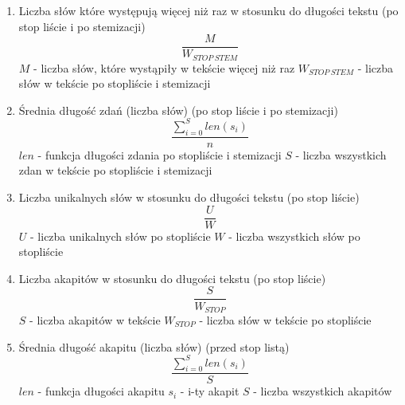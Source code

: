 \documentclass{classrep}
\begin{document}
\begin{enumerate}
  \item Liczba słów które występują więcej niż raz w stosunku do długości tekstu (po stop liście i po stemizacji)
  \newline 
  \begin{equation}
  	\frac{M}{W_{STOP\ STEM}}
  \end{equation}
  \newline \quad $M$ - liczba słów, które wystąpiły w tekście więcej niż raz
  \newline \quad $W_{STOP\ STEM}$ - liczba słów w tekście po stopliście i stemizacji
  
  \item Średnia długość zdań (liczba słów) (po stop liście i  po stemizacji)
  \newline
  \begin{equation}
  	\frac{\sum_{i=0}^S len(s_i)}{n}
  \end{equation}
  \newline \quad $len$ - funkcja długości zdania po stopliście i stemizacji
  \newline \quad $S$ - liczba wszystkich zdan w tekście po stopliście i stemizacji
  
  \item Liczba unikalnych słów w stosunku do długości tekstu (po stop liście)
  \newline
  \begin{equation}
  	\frac{U}{W}
  \end{equation}
  \newline \quad $U$ - liczba unikalnych słów po stopliście
  \newline \quad $W$ - liczba wszystkich słów po stopliście
  
  \item Liczba akapitów w stosunku do długości tekstu (po stop liście)
  \newline
  \begin{equation}
  	\frac{S}{W_{STOP}}
  \end{equation}
  \newline \quad $S$ - liczba akapitów w tekście
  \newline \quad $W_{STOP}$ - liczba słów w tekście po stopliście
  
  \item Średnia długość akapitu (liczba słów) (przed stop listą)
  \newline
  \begin{equation}
  	\frac{\sum_{i=0}^S len(s_i)}{S}
  \end{equation}
  \newline \quad $len$ - funkcja długości akapitu
  \newline \quad $s_i$ - i-ty akapit
  \newline \quad $S$ - liczba wszystkich akapitów
  

\end{enumerate}
\end{document}
